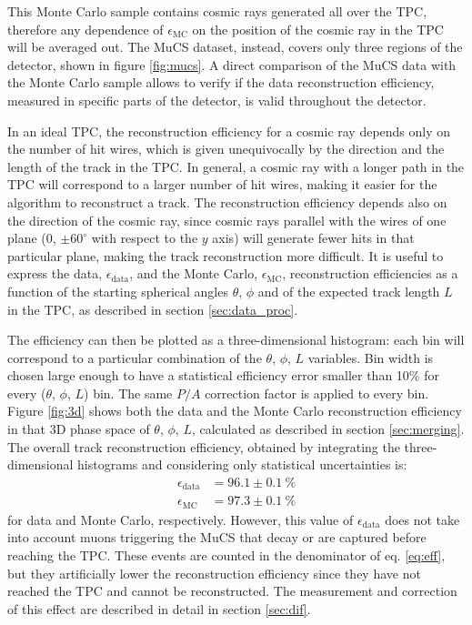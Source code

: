 \documentclass[a4paper,11pt]{article}
\begin{document}
This Monte Carlo sample contains cosmic rays generated all over the TPC, therefore  any dependence of $\epsilon_{\mathrm{MC}}$ on the position of the cosmic ray in the TPC will be averaged out. The MuCS dataset, instead, covers only three regions of the detector, shown in figure \ref{fig:mucs}. A direct comparison of the MuCS data with the Monte Carlo sample allows to verify if the data reconstruction efficiency, measured in specific parts of the detector, is valid throughout the detector.

In an ideal TPC, the reconstruction efficiency for a cosmic ray depends only on the number of hit wires, which is given unequivocally by the direction and the length of the track in the TPC. In general, a cosmic ray with a longer path in the TPC will correspond to a larger number of hit wires, making it easier for the algorithm to reconstruct a track. The reconstruction efficiency depends also on the direction of the cosmic ray, since cosmic rays parallel with the wires of one plane (0, $\pm60^{\circ}$ with respect to the $y$ axis) will generate fewer hits in that particular plane, making the track reconstruction more difficult.
It is useful to express the data, $\epsilon_{\mathrm{data}}$, and the Monte Carlo, $\epsilon_{\mathrm{MC}}$, reconstruction efficiencies as a function of the starting spherical angles $\theta$, $\phi$ and of the expected track length $L$ in the TPC, as described in section \ref{sec:data_proc}.

The efficiency can then be plotted as a three-dimensional histogram: each bin will correspond to a particular combination of the $\theta$, $\phi$, $L$ variables. Bin width is chosen large enough to have a statistical efficiency error smaller than 10\% for every ($\theta$, $\phi$, $L$) bin. The same $P/A$ correction factor is applied to every bin. Figure \ref{fig:3d} shows both the data and the Monte Carlo reconstruction efficiency in that 3D phase space of $\theta$, $\phi$, $L$, calculated as described in section \ref{sec:merging}. The overall track reconstruction efficiency, obtained by integrating the three-dimensional histograms and considering only statistical uncertainties is:
\begin{align*}
\epsilon_{\mathrm{data}} &= 96.1 \pm 0.1~\%\\
\epsilon_{\mathrm{MC}} &= 97.3 \pm 0.1~\%
\end{align*} for data and Monte Carlo, respectively. However, this value of $\epsilon_{\mathrm{data}}$ does not take into account muons triggering the MuCS that decay or are captured before reaching the TPC. These events are counted in the denominator of eq. \eqref{eq:eff}, but they artificially lower the reconstruction efficiency since they have not reached the TPC and cannot be reconstructed. The measurement and correction of this effect are described in detail in section \ref{sec:dif}.
\end{document}
